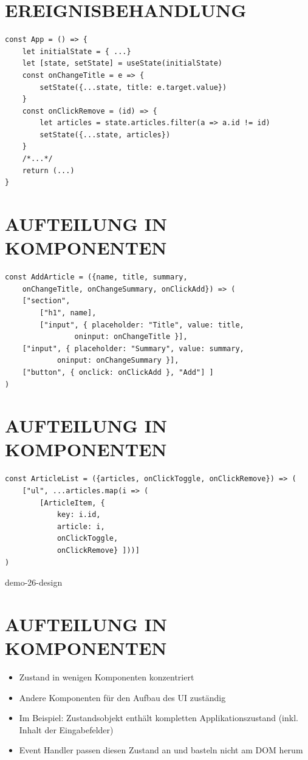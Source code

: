 \section*{EREIGNISBEHANDLUNG}
\begin{verbatim}
const App = () => {
    let initialState = { ...}
    let [state, setState] = useState(initialState)
    const onChangeTitle = e => {
        setState({...state, title: e.target.value})
    }
    const onClickRemove = (id) => {
        let articles = state.articles.filter(a => a.id != id)
        setState({...state, articles})
    }
    /*...*/
    return (...)
}
\end{verbatim}

\section*{AUFTEILUNG IN KOMPONENTEN}
\begin{verbatim}
const AddArticle = ({name, title, summary,
    onChangeTitle, onChangeSummary, onClickAdd}) => (
    ["section",
        ["h1", name],
        ["input", { placeholder: "Title", value: title,
                oninput: onChangeTitle }],
    ["input", { placeholder: "Summary", value: summary,
            oninput: onChangeSummary }],
    ["button", { onclick: onClickAdd }, "Add"] ]
)
\end{verbatim}

\section*{AUFTEILUNG IN KOMPONENTEN}
\begin{verbatim}
const ArticleList = ({articles, onClickToggle, onClickRemove}) => (
    ["ul", ...articles.map(i => (
        [ArticleItem, {
            key: i.id,
            article: i,
            onClickToggle,
            onClickRemove} ]))]
)
\end{verbatim}

demo-26-design

\section*{AUFTEILUNG IN KOMPONENTEN}
\begin{itemize}
  \item Zustand in wenigen Komponenten konzentriert
  \item Andere Komponenten für den Aufbau des UI zuständig
  \item Im Beispiel: Zustandsobjekt enthält kompletten Applikationszustand (inkl. Inhalt der Eingabefelder)
  \item Event Handler passen diesen Zustand an und basteln nicht am DOM herum
\end{itemize}

